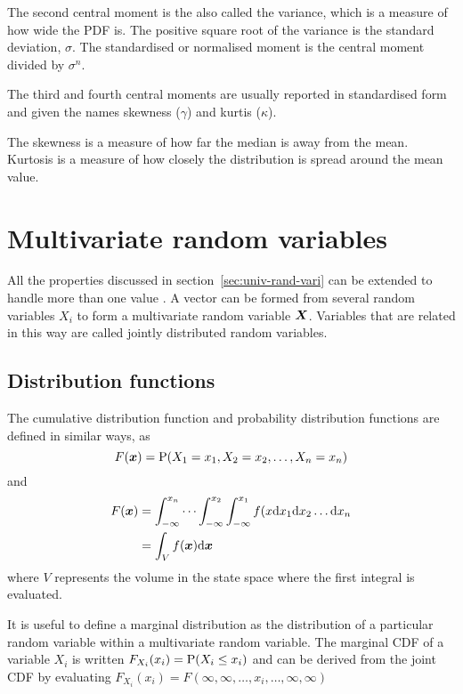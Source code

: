 The second central moment is the also called the variance, which is a measure of how wide the PDF is.
The positive square root of the variance is the standard deviation, $\sigma$.
The standardised or normalised moment is the central moment divided by $\sigma^n$.

The third and fourth central moments are usually reported in standardised form and given the names skewness ($\gamma$) and kurtis ($\kappa$).

The skewness is a measure of how far the median is away from the mean.
Kurtosis is a measure of how closely the distribution is spread around the mean value.

\section{Multivariate random variables}
All the properties discussed in section~\ref{sec:univ-rand-vari} can be extended to handle more than one value \cite[65]{kulkarni1999modeling}.
A vector can be formed from several random variables $X_i$ to form a multivariate random variable $\boldsymbol{X}$.
Variables that are related in this way are called jointly distributed random variables.

\subsection{Distribution functions}
The cumulative distribution function and probability distribution functions are defined in similar ways, as 
\begin{equation}
  \label{eq:mvcdf}
  F(\boldsymbol{x}) = \mathrm{P}(X_1=x_1, X_2=x_2,\dots, X_n = x_n)
\end{equation}
and
\begin{align}
  \label{eq:mvpdf}
  F(\boldsymbol{x}) &= \int_{-\infty}^{x_n}\cdots\int_{-\infty}^{x_2}\int_{-\infty}^{x_1} f(x \mathrm{d} x_1 \mathrm{d} x_2 \dots \mathrm{d} x_n \\
              &= \int_V f(\boldsymbol{x}) \mathrm{d} \boldsymbol{x}
\end{align}
where $V$ represents the volume in the state space where the first integral is evaluated.

It is useful to define a marginal distribution as the distribution of a particular random variable within a multivariate random variable.  
The marginal CDF of a variable $X_i$ is written $F_{X_i}(x_i) = \mathrm{P}(X_i \leq x_i)$ and can be derived from the joint CDF by evaluating $F_{X_i}(x_i) = F(\infty,\infty,\dots,x_i,\dots,\infty,\infty)$

